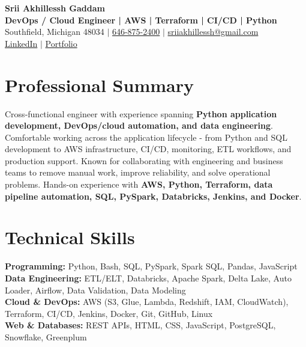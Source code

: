 \documentclass[letterpaper,10pt]{article}
\begin{document}
\fontsize{9.35pt}{10.45pt}\selectfont

\begin{center}
    {\LARGE \textbf{Srii Akhillessh Gaddam}} \\[-1pt]
    \textbf{DevOps / Cloud Engineer | AWS | Terraform | CI/CD | Python} \\[2pt]
    Southfield, Michigan 48034 $|$
    \href{tel:6468752400}{646-875-2400} $|$
    \href{mailto:sriiakhillessh@gmail.com}{sriiakhillessh@gmail.com} \\[1pt]
    \href{https://www.linkedin.com/in/srii-akhiilessh-gaddam-b48668191/}{LinkedIn} $|$
    \href{https://sriiakhillesshg.github.io/portfolio/}{Portfolio}
\end{center}
\vspace{-8pt}

\section{Professional Summary}
\small{Cross-functional engineer with experience spanning \textbf{Python application development, DevOps/cloud automation, and data engineering}. Comfortable working across the application lifecycle - from Python and SQL development to AWS infrastructure, CI/CD, monitoring, ETL workflows, and production support. Known for collaborating with engineering and business teams to remove manual work, improve reliability, and solve operational problems. Hands-on experience with \textbf{AWS, Python, Terraform, data pipeline automation, SQL, PySpark, Databricks, Jenkins, and Docker}.}

\section{Technical Skills}
\small{
\textbf{Programming:} Python, Bash, SQL, PySpark, Spark SQL, Pandas, JavaScript \\
\textbf{Data Engineering:} ETL/ELT, Databricks, Apache Spark, Delta Lake, Auto Loader, Airflow, Data Validation, Data Modeling \\
\textbf{Cloud \& DevOps:} AWS (S3, Glue, Lambda, Redshift, IAM, CloudWatch), Terraform, CI/CD, Jenkins, Docker, Git, GitHub, Linux \\
\textbf{Web \& Databases:} REST APIs, HTML, CSS, JavaScript, PostgreSQL, Snowflake, Greenplum
}
\end{document}
